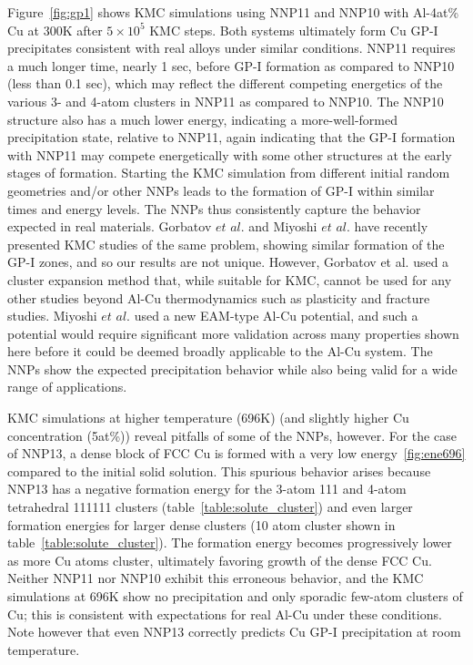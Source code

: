 \documentclass{article}
\begin{document}
Figure~\ref{fig:gp1} shows KMC simulations using NNP11 and NNP10 with Al-4at\% Cu at 300K after $5\times10^{5}$ KMC steps.  Both systems ultimately form Cu GP-I precipitates consistent with real alloys under similar conditions. NNP11 requires a much longer time, nearly 1 sec, before GP-I formation as compared to NNP10 (less than 0.1 sec), which may reflect the different competing energetics of the various 3- and 4-atom clusters in NNP11 as compared to NNP10. The NNP10 structure also has a much lower energy, indicating a more-well-formed precipitation state, relative to NNP11, again indicating that the GP-I formation with NNP11 may compete energetically with some other structures at the early stages of formation. Starting the KMC simulation from different initial random geometries and/or other NNPs leads to the formation of GP-I within similar times and energy levels. The NNPs thus consistently capture the behavior expected in real materials.  Gorbatov $\textit{et al.}$\cite{Gorbatov2019EffectiveAlloys} and Miyoshi $\textit{et al.}$\cite{Miyoshi2019Temperature-dependentApproach} have recently presented KMC studies of the same problem, showing similar formation of the GP-I zones, and so our results are not unique.  However, Gorbatov et al. used a cluster expansion method that, while suitable for KMC, cannot be used for any other studies beyond Al-Cu thermodynamics such as plasticity and fracture studies. Miyoshi $\textit{et al.}$\cite{Miyoshi2019Temperature-dependentApproach} used a new EAM-type Al-Cu potential, and such a potential would require significant more validation across many properties shown here before it could be deemed broadly applicable to the Al-Cu system. The NNPs show the expected precipitation behavior while also being valid for a wide range of applications.

KMC simulations at higher temperature (696K) (and slightly higher Cu concentration (5at\%)) reveal pitfalls of some of the NNPs, however. For the case of NNP13, a dense block of FCC Cu is formed with a very low energy~\ref{fig:ene696} compared to the initial solid solution. This spurious behavior arises because NNP13 has a negative formation energy for the 3-atom 111 and 4-atom tetrahedral 111111 clusters (table~\ref{table:solute_cluster}) and even larger formation energies for larger dense clusters (10 atom cluster shown in table~\ref{table:solute_cluster}). The formation energy becomes progressively lower as more Cu atoms cluster, ultimately favoring growth of the dense FCC Cu. Neither NNP11 nor NNP10 exhibit this erroneous behavior, and the KMC simulations at 696K show no precipitation and only sporadic few-atom clusters of Cu; this is consistent with expectations for real Al-Cu under these conditions. Note however that even NNP13 correctly predicts Cu GP-I precipitation at room temperature.
\end{document}
